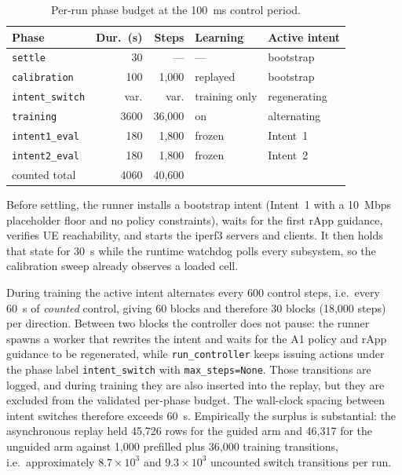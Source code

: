 \begin{table}[t]
\centering
\footnotesize
\caption{Per-run phase budget at the 100~ms control period.}
\label{tab:proto-phases}
\begin{tabular}{lrrll}
\toprule
Phase & Dur.\ (s) & Steps & Learning & Active intent\\
\midrule
\texttt{settle}        & 30   & ---     & ---      & bootstrap\\
\texttt{calibration}   & 100  & 1{,}000 & replayed & bootstrap\\
\texttt{intent\_switch}& var. & var.    & training only & regenerating\\
\texttt{training}      & 3600 & 36{,}000& on       & alternating\\
\texttt{intent1\_eval} & 180  & 1{,}800 & frozen   & Intent~1\\
\texttt{intent2\_eval} & 180  & 1{,}800 & frozen   & Intent~2\\
\midrule
counted total          & 4060 & 40{,}600 & & \\
\bottomrule
\end{tabular}
\end{table}

Before settling, the runner installs a bootstrap intent (Intent~1 with a 10~Mbps placeholder
floor and no policy constraints), waits for the first rApp guidance, verifies UE reachability,
and starts the iperf3 servers and clients. It then holds that state for 30~s while the runtime
watchdog polls every subsystem, so the calibration sweep already observes a loaded cell.

During training the active intent alternates every 600 control steps, i.e.\ every 60~s of
\emph{counted} control, giving 60 blocks and therefore 30 blocks (18{,}000 steps) per
direction. Between two blocks the controller does not pause: the runner spawns a worker that
rewrites the intent and waits for the A1 policy and rApp guidance to be regenerated, while
\texttt{run\_controller} keeps issuing actions under the phase label \texttt{intent\_switch}
with \texttt{max\_steps=None}. Those transitions are logged, and during training they are also
inserted into the replay, but they are excluded from the validated per-phase budget. The
wall-clock spacing between intent switches therefore exceeds 60~s. Empirically the surplus is
substantial: the asynchronous replay held 45{,}726 rows for the guided arm and 46{,}317 for
the unguided arm against 1{,}000 prefilled plus 36{,}000 training transitions, i.e.\
approximately $8.7\times10^3$ and $9.3\times10^3$ uncounted switch transitions per run.

